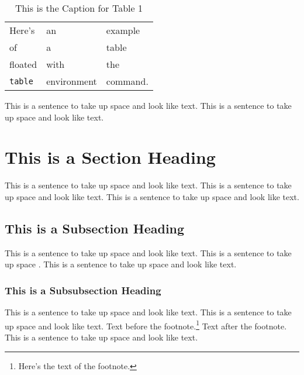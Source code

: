 \begin{table}
\caption[This is the Caption for Table 1]
            {This is the Caption for Table 1\cite{thisbook}}
\begin{center}
\begin{tabular}{lll}
Here's       & an          & example  \\
of           & a           & table    \\
floated      & with        & the      \\
\verb+table+ & environment & command.
\end{tabular}
\end{center}
\end{table}

This is a sentence to take up space and look like text.
This is a sentence to take up space and look like text.

\section{This is a Section Heading}

This is a sentence to take up space and look like text.
This is a sentence to take up space and look like text.
This is a sentence to take up space and look like text.

\subsection{This is a Subsection Heading}

This is a sentence to take up space and look like text.
This is a sentence to take up space \cite{anotherbook}.
This is a sentence to take up space and look like text.

\subsubsection{This is a Subsubsection Heading}
This is a sentence to take up space and look like text.
This is a sentence to take up space and look like text.
Text before the footnote.\footnote{Here's the text of the footnote.}
Text after the footnote.
This is a sentence to take up space and look like text.

